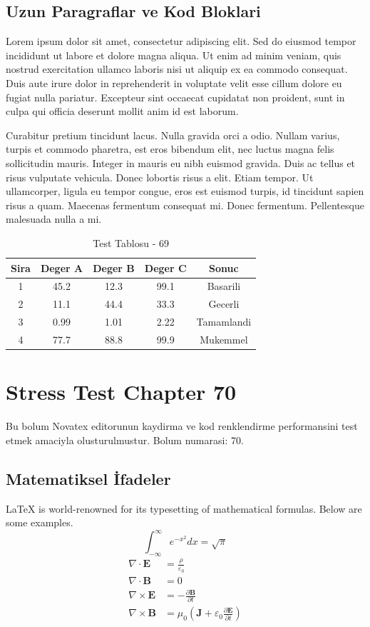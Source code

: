 \documentclass[12pt,a4paper]{article}
\begin{document}
\subsection{Uzun Paragraflar ve Kod Bloklari}
Lorem ipsum dolor sit amet, consectetur adipiscing elit. Sed do eiusmod tempor incididunt ut labore et dolore magna aliqua. Ut enim ad minim veniam, quis nostrud exercitation ullamco laboris nisi ut aliquip ex ea commodo consequat. Duis aute irure dolor in reprehenderit in voluptate velit esse cillum dolore eu fugiat nulla pariatur. Excepteur sint occaecat cupidatat non proident, sunt in culpa qui officia deserunt mollit anim id est laborum.

Curabitur pretium tincidunt lacus. Nulla gravida orci a odio. Nullam varius, turpis et commodo pharetra, est eros bibendum elit, nec luctus magna felis sollicitudin mauris. Integer in mauris eu nibh euismod gravida. Duis ac tellus et risus vulputate vehicula. Donec lobortis risus a elit. Etiam tempor. Ut ullamcorper, ligula eu tempor congue, eros est euismod turpis, id tincidunt sapien risus a quam. Maecenas fermentum consequat mi. Donec fermentum. Pellentesque malesuada nulla a mi.

\begin{table}[h!]
\centering
\begin{tabular}{|c|c|c|c|c|}
\hline
\textbf{Sira} & \textbf{Deger A} & \textbf{Deger B} & \textbf{Deger C} & \textbf{Sonuc} \\
\hline
1 & 45.2 & 12.3 & 99.1 & Basarili \\
2 & 11.1 & 44.4 & 33.3 & Gecerli \\
3 & 0.99 & 1.01 & 2.22 & Tamamlandi \\
4 & 77.7 & 88.8 & 99.9 & Mukemmel \\
\hline
\end{tabular}
\caption{Test Tablosu - 69}
\end{table}

\newpage
\section{Stress Test Chapter 70}
Bu bolum Novatex editorunun kaydirma ve kod renklendirme performansini test etmek amaciyla olusturulmustur. Bolum numarasi: 70.

\subsection{Matematiksel İfadeler}
\LaTeX{} is world-renowned for its typesetting of mathematical formulas. Below are some examples.
\begin{equation}
\int_{-\infty}^{\infty} e^{-x^2} dx = \sqrt{\pi}
\end{equation}
\begin{align}
\nabla \cdot \mathbf{E} &= \frac{\rho}{\varepsilon_0} \\
\nabla \cdot \mathbf{B} &= 0 \\
\nabla \times \mathbf{E} &= -\frac{\partial \mathbf{B}}{\partial t} \\
\nabla \times \mathbf{B} &= \mu_0\left(\mathbf{J} + \varepsilon_0 \frac{\partial \mathbf{E}}{\partial t}\right)
\end{align}
\end{document}
